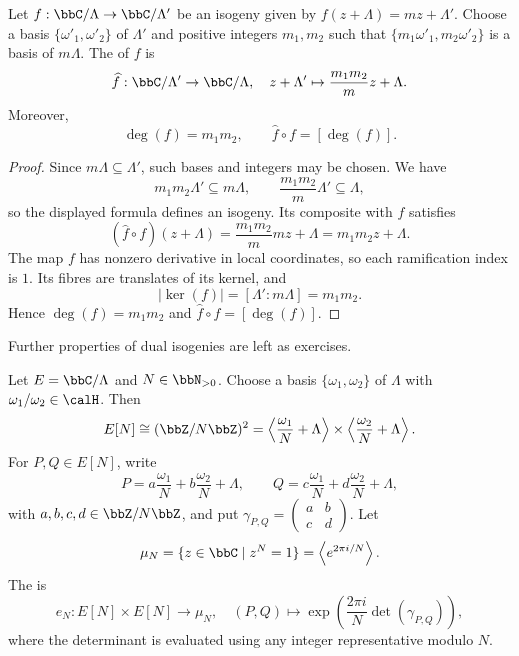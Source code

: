 \begin{thmdef}\label{Def:MF_dual_isogeny}
    Let $f : \bbC/\Lambda \to \bbC/\Lambda'$ be an isogeny given by $f(z + \Lambda) = mz + \Lambda'$. Choose a basis $\{\omega'_1, \omega'_2\}$ of $\Lambda'$ and positive integers $m_1, m_2$ such that $\{m_1\omega'_1, m_2\omega'_2\}$ is a basis of $m\Lambda$. The  of $f$ is
    \[
        \widehat f : \bbC/\Lambda' \to \bbC/\Lambda, \quad z + \Lambda' \mapsto \frac{m_1m_2}{m}z + \Lambda.
    \]
    Moreover,
    \[
        \deg(f) = m_1m_2, \qquad \widehat f \circ f = [\deg(f)].
    \]
\end{thmdef}

\begin{proof}
    Since $m\Lambda \subseteq \Lambda'$, such bases and integers may be chosen. We have
    \[
        m_1m_2\Lambda' \subseteq m\Lambda, \qquad \frac{m_1m_2}{m}\Lambda' \subseteq \Lambda,
    \]
    so the displayed formula defines an isogeny. Its composite with $f$ satisfies
    \[
        (\widehat f \circ f)(z + \Lambda) = \frac{m_1m_2}{m}mz + \Lambda = m_1m_2z + \Lambda.
    \]
    The map $f$ has nonzero derivative in local coordinates, so each ramification index is $1$. Its fibres are translates of its kernel, and
    \[
        |\ker(f)| = [\Lambda' : m\Lambda] = m_1m_2.
    \]
    Hence $\deg(f) = m_1m_2$ and $\widehat f \circ f = [\deg(f)]$.
\end{proof}

\begin{remarkstar}
    Further properties of dual isogenies are left as exercises.
\end{remarkstar}

\begin{definition}\label{Def:MF_Weil_pairing}
    Let $E = \bbC/\Lambda$ and $N \in \bbN_{>0}$. Choose a basis $\{\omega_1, \omega_2\}$ of $\Lambda$ with $\omega_1/\omega_2 \in \calH$. Then
    \[
        E[N] \cong (\bbZ/N\bbZ)^2 = \left\langle\frac{\omega_1}{N} + \Lambda\right\rangle \times \left\langle\frac{\omega_2}{N} + \Lambda\right\rangle.
    \]
    For $P, Q \in E[N]$, write
    \[
        P = a\frac{\omega_1}{N} + b\frac{\omega_2}{N} + \Lambda, \qquad Q = c\frac{\omega_1}{N} + d\frac{\omega_2}{N} + \Lambda,
    \]
    with $a, b, c, d \in \bbZ/N\bbZ$, and put $\gamma_{P,Q} = \begin{pmatrix}a & b\\ c & d\end{pmatrix}$. Let
    \[
        \mu_N = \{z \in \bbC \mid z^N = 1\} = \left\langle e^{2\pi i/N}\right\rangle.
    \]
    The  is
    \[
        e_N : E[N] \times E[N] \to \mu_N, \quad (P, Q) \mapsto \exp\left(\frac{2\pi i}{N}\det(\gamma_{P,Q})\right),
    \]
    where the determinant is evaluated using any integer representative modulo $N$.
\end{definition}

